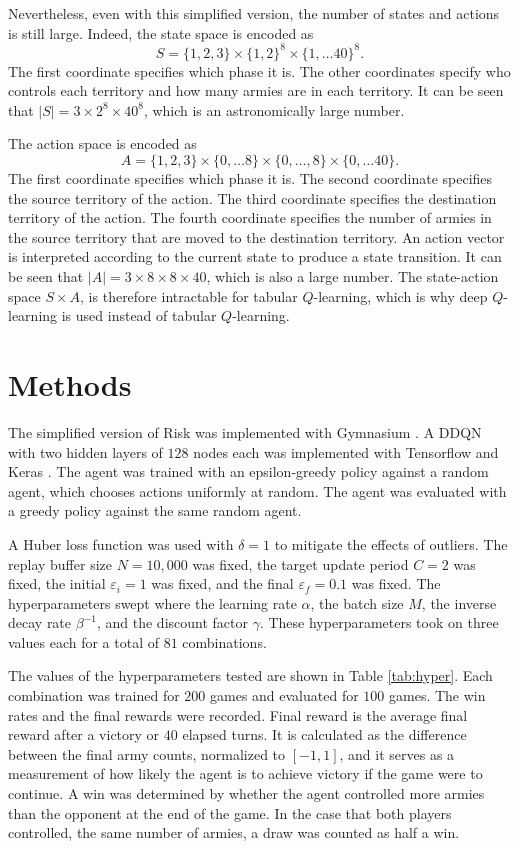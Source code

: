 \documentclass[final,5p,times,twocolumn]{elsarticle}
\begin{document}
Nevertheless, even with this simplified version, the number of states and actions is still large. Indeed, the state space is encoded as 
$$S = \{1, 2, 3\} \times \{1, 2\}^{8} \times \{1, \ldots 40\}^{8}.$$
The first coordinate specifies which phase it is. The other coordinates specify who controls each territory and how many armies are in each territory. It can be seen that $|S| = 3 \times 2^{8} \times 40^{8}$, which is an astronomically large number.

The action space is encoded as 
$$A = \{1, 2, 3\} \times \{0, \ldots 8\} \times \{0, \ldots, 8\} \times \{0, \ldots 40\}.$$
The first coordinate specifies which phase it is. The second coordinate specifies the source territory of the action. The third coordinate specifies the destination territory of the action. The fourth coordinate specifies the number of armies in the source territory that are moved to the destination territory. An action vector is interpreted according to the current state to produce a state transition. It can be seen that $|A| = 3 \times 8 \times 8 \times 40$, which is also a large number. The state-action space $S \times A$, is therefore intractable for tabular $Q$-learning, which is why deep $Q$-learning is used instead of tabular $Q$-learning.
\section{Methods}
\label{sec:methods}

The simplified version of Risk was implemented with Gymnasium \cite{towers2024gymnasium}. A DDQN with two hidden layers of $128$ nodes each was implemented with Tensorflow and Keras \cite{chollet2015keras} \cite{tensorflow2015}. The agent was trained with an epsilon-greedy policy against a random agent, which chooses actions uniformly at random. The agent was evaluated with a greedy policy against the same random agent.

A Huber loss function was used with $\delta = 1$ to mitigate the effects of outliers. The replay buffer size $N = 10,000$ was fixed, the target update period $C = 2$ was fixed, the initial $\varepsilon_{i} = 1$ was fixed, and the final $\varepsilon_{f} = 0.1$ was fixed. The hyperparameters swept where the learning rate $\alpha$, the batch size $M$, the inverse decay rate $\beta^{-1}$, and the discount factor $\gamma$. These hyperparameters took on three values each for a total of $81$ combinations.

The values of the hyperparameters tested are shown in Table \ref{tab:hyper}. Each combination was trained for $200$ games and evaluated for $100$ games. The win rates and the final rewards were recorded. Final reward is the average final reward after a victory or $40$ elapsed turns. It is calculated as the difference between the final army counts, normalized to $[-1, 1]$, and it serves as a measurement of how likely the agent is to achieve victory if the game were to continue. A win was determined by whether the agent controlled more armies than the opponent at the end of the game. In the case that both players controlled, the same number of armies, a draw was counted as half a win.
\end{document}
